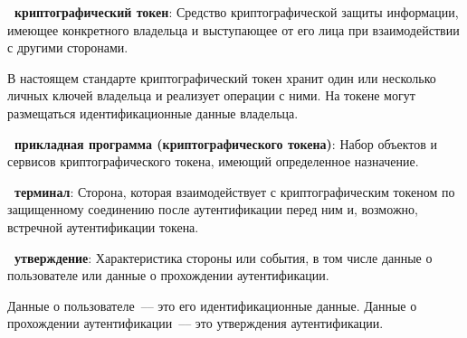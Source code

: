 {\bf\thedefctr~криптографический токен}: 
Средство криптографической защиты информации, имеющее конкретного 
владельца и выступающее от его лица при взаимодействии с другими 
сторонами. 
%
\begin{note*}
В настоящем стандарте криптографический токен хранит один 
или несколько личных ключей владельца и реализует операции с ними.  
%
На токене могут размещаться идентификационные данные владельца. 
\end{note*}

{\bf \thedefctr~прикладная программа (криптографического токена)}:
Набор объектов и сервисов криптографического токена, имеющий определенное 
назначение.

{\bf\thedefctr~терминал}: 
Сторона, которая взаимодействует с криптографическим токеном по 
защищенному соединению после аутентификации перед ним и, возможно, 
встречной аутентификации токена.

{\bf \thedefctr~утверждение}:
Характеристика стороны или события, 
в том числе данные о пользователе 
или данные о прохождении аутентификации.

\begin{note*}
Данные о пользователе~--– это его идентификационные данные. 
Данные о прохождении аутентификации~--– это утверждения аутентификации.
\end{note*}

